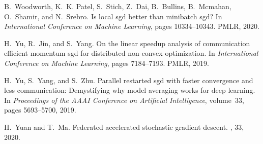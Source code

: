 \documentclass[11pt]{article}
\begin{document}
\begin{thebibliography}{10}
B.~Woodworth, K.~K. Patel, S.~Stich, Z.~Dai, B.~Bullins, B.~Mcmahan, O.~Shamir,
  and N.~Srebro.
\newblock Is local sgd better than minibatch sgd?
\newblock In {\em International Conference on Machine Learning}, pages
  10334--10343. PMLR, 2020.

H.~Yu, R.~Jin, and S.~Yang.
\newblock On the linear speedup analysis of communication efficient momentum
  sgd for distributed non-convex optimization.
\newblock In {\em International Conference on Machine Learning}, pages
  7184--7193. PMLR, 2019.

H.~Yu, S.~Yang, and S.~Zhu.
\newblock Parallel restarted sgd with faster convergence and less
  communication: Demystifying why model averaging works for deep learning.
\newblock In {\em Proceedings of the AAAI Conference on Artificial
  Intelligence}, volume~33, pages 5693--5700, 2019.

H.~Yuan and T.~Ma.
\newblock Federated accelerated stochastic gradient descent.
, 33, 2020.

\end{thebibliography}
\end{document}
